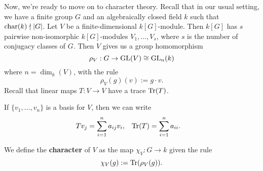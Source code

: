 Now, we're ready to move on to character theory. Recall that in our 
usual setting, we have a finite group $G$ and an algebraically closed field 
$k$ such that $\operatorname{char}(k) \nmid |G|$. Let $V$ be a finite-dimensional $k[G]$-module. 
Then $k[G]$ has $s$ pairwise non-isomorphic $k[G]$-modules $V_1, \dots, V_s$, 
where $s$ is the number of conjugacy classes of $G$. Then $V$ gives us a 
group homomorphism 
\[ \rho_V : G \to \operatorname{GL}(V) \cong \operatorname{GL}_n(k) \] 
where $n = \dim_k(V)$, with the rule 
\[ \rho_V(g)(v) := g \cdot v. \] 
Recall that linear maps $T : V \to V$ have a trace $\operatorname{Tr}(T)$. 

\begin{remark}{}
    If $\{v_1, \dots, v_n\}$ is a basis for $V$, then we can write 
    \begin{align*} 
        Tv_j &= \sum_{i=1}^n a_{ij} v_i, & \operatorname{Tr}(T) &= \sum_{i=1}^n a_{ii}. 
    \end{align*}
\end{remark}

\begin{defn}{}
    We define the {\bf character} of $V$ as the map $\chi_V : G \to k$
    given the rule 
    \[ \chi_V(g) := \operatorname{Tr}(\rho_V(g)). \] 
\end{defn}

